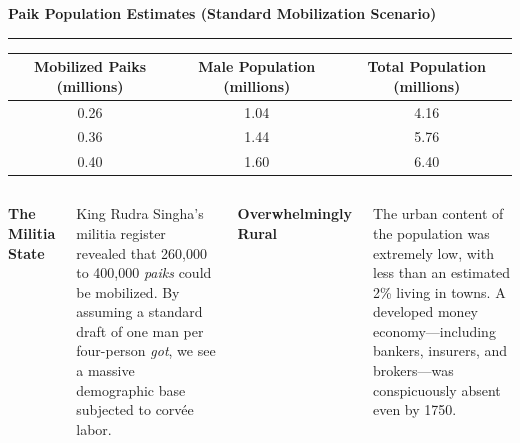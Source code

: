 \documentclass[aspectratio=169, 10pt]{beamer}
\newcommand{\slidetitle}[1]{%
  \vspace{-4pt}%
  {\usebeamerfont{frametitle}\Large\color{ink}\textbf{#1}}%
  \par\vspace{2pt}%
  {\color{clay}\rule{40pt}{2pt}}%
  \par\vspace{8pt}%
}
\newcommand{\infobox}[2]{%
  \begin{minipage}{\textwidth}
    {\bfseries\color{deepgreen}#1}\par\vspace{3pt}%
    \color{ink}#2
  \end{minipage}\par
}
\newcommand{\critiquebox}[2]{%
  \begin{minipage}{\textwidth}
    {\bfseries\color{burgundy}#1}\par\vspace{3pt}%
    \color{ink}#2
  \end{minipage}\par
}
\begin{document}
\begin{frame}
\slidetitle{Paik Population Estimates (Standard Mobilization Scenario)}

\vspace{6pt}
\begin{center}
\small
\begin{tabular}{ccc}
\arrayrulecolor{warmgray}
\toprule
\textbf{Mobilized Paiks (millions)} & \textbf{Male Population (millions)} & \textbf{Total Population (millions)} \\
\midrule
0.26 & 1.04 & 4.16 \\
0.36 & 1.44 & 5.76 \\
0.40 & 1.60 & 6.40 \\
\bottomrule
\end{tabular}
\end{center}

\vspace{10pt}
\begin{columns}[T]
\infobox{The Militia State}{%
  King Rudra Singha's militia register revealed that 260,000 to 400,000 \textit{paiks} could be mobilized. By assuming a standard draft of one man per four-person \textit{got}, we see a massive demographic base subjected to corv\'{e}e labor.
}

\critiquebox{Overwhelmingly Rural}{%
  The urban content of the population was extremely low, with less than an estimated 2\% living in towns. A developed money economy---including bankers, insurers, and brokers---was conspicuously absent even by 1750.
}
\end{columns}
\end{frame}
\end{document}
